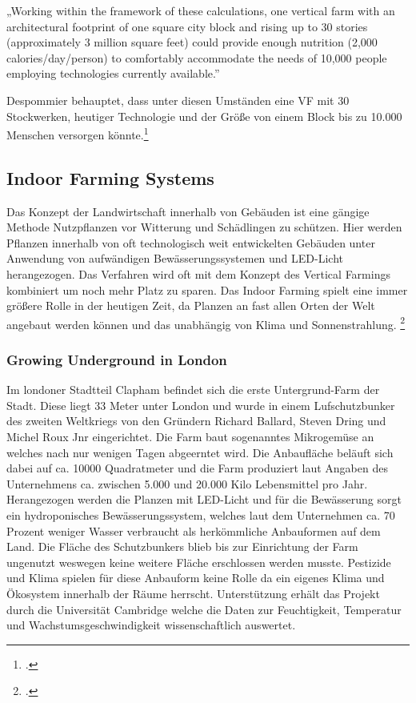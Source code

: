 \documentclass{scrartcl}
\begin{document}
\begin{displayquote}
„Working within the framework of these calculations, one vertical farm with an architectural footprint of one square city block and rising up to 30 stories (approximately 3 million square feet) could provide enough nutrition (2,000 calories/day/person) to comfortably accommodate the needs of 10,000 people employing technologies currently available.” 
\end{displayquote}

Despommier behauptet, dass unter diesen Umständen eine VF mit 30 Stockwerken, heutiger Technologie und der Größe von einem Block bis zu 10.000 Menschen versorgen könnte.\footcite{Despommier2010TheCentury.}


\subsection{Indoor Farming Systems}

Das Konzept der Landwirtschaft innerhalb von Gebäuden ist eine gängige Methode Nutzpflanzen vor Witterung und Schädlingen zu schützen. Hier werden Pflanzen innerhalb von oft technologisch weit entwickelten Gebäuden unter Anwendung von aufwändigen Bewässerungssystemen und LED-Licht herangezogen. Das Verfahren wird oft mit dem Konzept des Vertical Farmings kombiniert um noch mehr Platz zu sparen. Das Indoor Farming spielt eine immer größere Rolle in der heutigen Zeit, da Planzen an fast allen Orten der Welt angebaut werden können und das unabhängig von Klima und Sonnenstrahlung. \footcite[14.10.2018]{ACHTUNG}

\subsubsection{Growing Underground in London}

Im londoner Stadtteil Clapham befindet sich die erste Untergrund-Farm der Stadt. Diese liegt 33 Meter unter London und wurde in einem Lufschutzbunker des zweiten Weltkriegs von den Gründern  Richard Ballard, Steven Dring und Michel Roux Jnr eingerichtet. Die Farm baut sogenanntes Mikrogemüse an welches nach nur wenigen Tagen abgeerntet wird. Die Anbaufläche beläuft sich dabei auf ca. 10000 Quadratmeter und die Farm produziert laut Angaben des Unternehmens ca. zwischen 5.000 und 20.000 Kilo Lebensmittel pro Jahr. Herangezogen werden die Planzen mit LED-Licht und für die Bewässerung sorgt ein hydroponisches Bewässerungssystem, welches laut dem Unternehmen ca. 70 Prozent weniger Wasser verbraucht als herkömmliche Anbauformen auf dem Land. Die Fläche des Schutzbunkers blieb bis zur Einrichtung der Farm ungenutzt weswegen keine weitere Fläche erschlossen werden musste. Pestizide und Klima spielen für diese Anbauform keine Rolle da ein eigenes Klima und Ökosystem innerhalb der Räume herrscht. Unterstützung erhält das Projekt durch die Universität Cambridge welche die Daten zur Feuchtigkeit, Temperatur und Wachstumsgeschwindigkeit wissenschaftlich auswertet.
\end{document}
